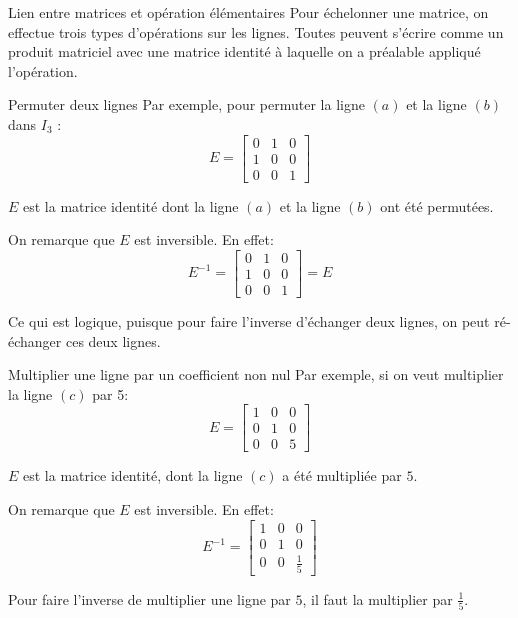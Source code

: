 \documentclass[a4paper]{article}
\begin{document}
\begin{parag}{Lien entre matrices et opération élémentaires}
    Pour échelonner une matrice, on effectue trois types d'opérations sur les lignes. Toutes peuvent s'écrire comme un produit matriciel avec une matrice identité à laquelle on a préalable appliqué l'opération.

    \begin{subparag}{Permuter deux lignes}
        Par exemple, pour permuter la ligne $\left(a\right)$ et la ligne $\left(b\right)$ dans $I_3$ :
        \[E = \begin{bmatrix} 0 & 1 & 0 \\ 1 & 0 & 0 \\ 0 & 0 & 1 \end{bmatrix} \]

        $E$ est la matrice identité dont la ligne $\left(a\right)$ et la ligne $\left(b\right)$ ont été permutées.

        On remarque que $E$ est inversible. En effet:
        \[E^{-1} = \begin{bmatrix} 0 & 1 & 0 \\ 1 & 0 & 0 \\ 0 & 0 & 1 \end{bmatrix} = E\]

        Ce qui est logique, puisque pour faire l'inverse d'échanger deux lignes, on peut ré-échanger ces deux lignes.
    \end{subparag}

    \begin{subparag}{Multiplier une ligne par un coefficient non nul}
        Par exemple, si on veut multiplier la ligne $\left(c\right)$ par 5:
        \[E = \begin{bmatrix} 1 & 0 & 0 \\ 0 & 1 & 0 \\ 0 & 0 & 5 \end{bmatrix} \]

        $E$ est la matrice identité, dont la ligne $\left(c\right)$ a été multipliée par $5$.

        On remarque que $E$ est inversible. En effet:
        \[E^{-1} = \begin{bmatrix} 1 & 0 & 0 \\ 0 & 1 & 0 \\ 0 & 0 & \frac{1}{5} \end{bmatrix} \]

        Pour faire l'inverse de multiplier une ligne par $5$, il faut la multiplier par $\frac{1}{5}$.
    \end{subparag}


\end{parag}
\end{document}
